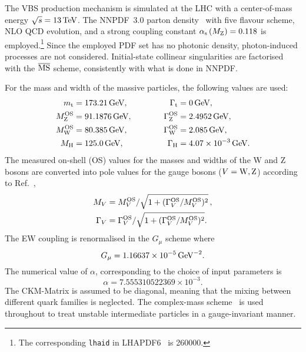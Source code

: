 The VBS production mechanism is simulated at the LHC with a center-of-mass energy $\sqrt s = 13 \,\text{TeV}$.
The NNPDF~3.0 parton density~\cite{Ball:2014uwa} with five flavour scheme, NLO QCD evolution, and a strong coupling constant $\alpha_\text{s}\left( M_\text{Z} \right) = 0.118$ is employed.\footnote{The corresponding {\tt lhaid} in LHAPDF6~\cite{Buckley:2014ana} is 260000.}
Since the employed PDF set has no photonic density, photon-induced processes are not considered.
Initial-state collinear singularities are factorised with the ${\overline{\rm MS}}$ scheme, consistently with what is done in NNPDF.

For the mass and width of the massive particles, the following values are used:
%
\begin{alignat}{2}
                  m_\text{t}   &=  173.21\,\text{GeV},       & \quad \quad \quad \Gamma_\text{t} &= 0 \,\text{GeV},  \nonumber \\
                M_\text{Z}^\text{OS} &=  91.1876\,\text{GeV},      & \quad \quad \quad \Gamma_\text{Z}^\text{OS} &= 2.4952\,\text{GeV},  \nonumber \\
                M_\text{W}^\text{OS} &=  80.385\,\text{GeV},       & \Gamma_\text{W}^\text{OS} &= 2.085\,\text{GeV},  \nonumber \\
                M_{\rm H} &=  125.0\,\text{GeV},       &  \Gamma_\text{H}   &=  4.07 \times 10^{-3}\,\text{GeV}.
\end{alignat}
%
The measured on-shell (OS) values for the masses and widths of the W and Z bosons are converted into pole values for the gauge bosons ($V=\text{W},\text{Z}$) according to Ref.~\cite{Bardin:1988xt},
%
\begin{equation}
\begin{split}
        M_V &= M_{V}^\text{OS}/\sqrt{1+(\Gamma_{V}^\text{OS}/M_{V}^\text{OS})^2}\,, \\
   \Gamma_V &= \Gamma_{V}^\text{OS}/\sqrt{1+(\Gamma_{V}^\text{OS}/M_{V}^\text{OS})^2}.
\end{split}
\end{equation}
%
The EW coupling is renormalised in the $G_\mu$ scheme \cite{Denner:2000bj} where
%
\begin{equation}
    G_{\mu}    = 1.16637\times 10^{-5}\,\text{GeV}^{-2}.
\end{equation}
%
The numerical value of $\alpha$, corresponding to the choice of input parameters is
%
\begin{equation}
 \alpha = 7.555310522369 \times 10^{-3}.
\end{equation}
The CKM-Matrix is assumed to be diagonal, meaning that the mixing between different quark families is neglected.
The complex-mass scheme~\cite{Denner:1999gp,Denner:2005fg} is used throughout to treat unstable intermediate particles in a gauge-invariant manner.

